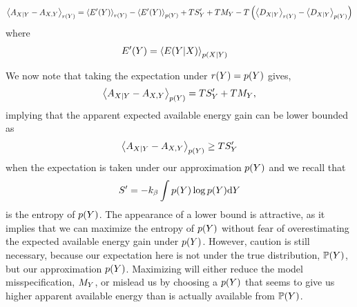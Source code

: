 \documentclass[]{article}
\begin{document}
%
\[
\left\langle A_{X|Y} - A_{X,Y} \right\rangle_{r(Y)} =  \left\langle E^\prime(Y) \right\rangle_{r(Y)} -  \left\langle E^\prime(Y) \right\rangle_{p(Y)}+ TS^\prime_Y + TM_{Y}  - T\left(\left\langle D_{X|Y} \right\rangle_{r(Y)} - \left\langle D_{X|Y} \right\rangle_{p(Y)}\right)
\] 
%
where 
\begin{align*}
  E^\prime(Y) &= \left\langle E(Y|X) \right\rangle_{p(X|Y)}
\end{align*}

We now note that taking the expectation under $r(Y) = p(Y)$ gives,
\[
\left\langle A_{X|Y} - A_{X,Y} \right\rangle_{p(Y)} =TS^\prime_Y + TM_Y,
\]
implying that the apparent expected available energy gain can be lower bounded as
\[
\left\langle A_{X|Y} - A_{X,Y} \right\rangle_{p(Y)}  \geq TS^\prime_Y
\]
when the expectation is taken under our approximation $p(Y)$ and we recall that
\[
S^\prime = - k_\beta \int p(Y) \log p(Y) \text{d} Y
\]
is the entropy of $p(Y)$. The appearance of a lower bound is attractive, as it implies that we can maximize the entropy of $p(Y)$ without fear of overestimating the expected available energy gain under $p(Y)$. However, caution is still necessary, because our expectation here is not under the true distribution, $\mathbb{P}(Y)$, but our approximation $p(Y)$. Maximizing will either reduce the model misspecification, $M_Y$, or mislead us by choosing a $p(Y)$ that seems to give us higher apparent available energy than is actually available from $\mathbb{P}(Y)$.
\end{document}
